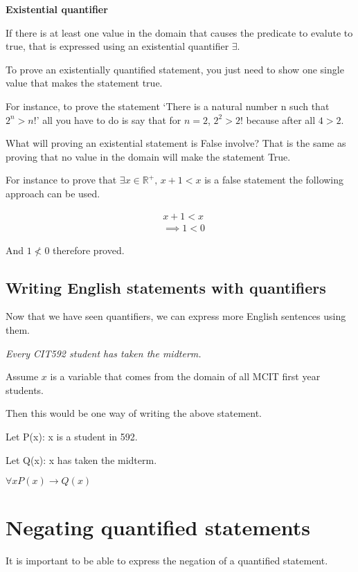 \documentclass[12pt]{article}
\begin{document}
\medskip

\textbf{Existential quantifier}

If there is at least one value in the domain that causes the predicate to evalute to true, that is expressed using an existential quantifier $\exists$.

To prove an existentially quantified statement, you just need to show one single value that makes the statement true.

For instance, to prove the statement `There is a natural number n such that $2^n > n!$' all you have to do is say that for $n=2$, $2^2 > 2!$ because after all $4 > 2$.

What will proving an existential statement is False involve? That is the same as proving that no value in the domain will make the statement True.

For instance to prove that $\exists x \in \mathbb{R^+}, \, x + 1 < x$ is a false statement the following approach can be used.

\begin{align*}
& x + 1 < x 
\\ & \implies 1 < 0 \tag{ by subtracting x from both sides}
\end{align*}

And $1 \not < 0$ therefore proved.

\subsection*{Writing English statements with quantifiers}

Now that we have seen quantifiers, we can express more English sentences using them.

\medskip

\emph{Every CIT592 student has taken the midterm.}

Assume $x$ is a variable that comes from the domain of all MCIT first year students.

Then this would be one way of writing the above statement.

Let P(x): x is a student in 592.

Let Q(x): x has taken the midterm.

$\forall x P(x) \rightarrow Q(x)$ 

\section*{Negating quantified statements}
It is important to be able to express the negation of a quantified statement.
\end{document}
